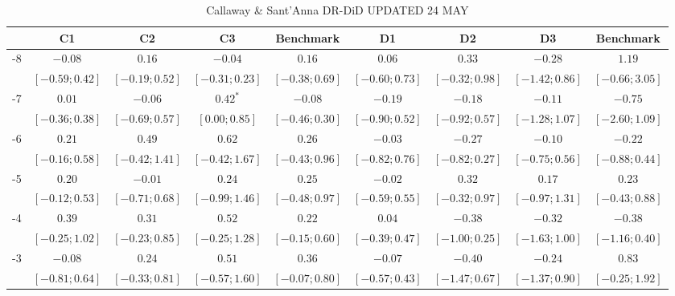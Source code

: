 \documentclass[12pt]{amsart}
\begin{document}
\begin{table}
  \centering
  \caption{Callaway \& Sant'Anna DR-DiD UPDATED 24 MAY}
  \begin{adjustbox}{width=\textwidth}
\begin{tabular}{l c c c c | c c c c}
\hline
 & C1 & C2 & C3 & Benchmark & D1 & D2 & D3 & Benchmark \\
\hline
-8 & $-0.08$          & $0.16$           & $-0.04$          & $0.16$           & $0.06$           & $0.33$           & $-0.28$          & $1.19$           \\
   & $ [-0.59; 0.42]$ & $ [-0.19; 0.52]$ & $ [-0.31; 0.23]$ & $ [-0.38; 0.69]$ & $ [-0.60; 0.73]$ & $ [-0.32; 0.98]$ & $ [-1.42; 0.86]$ & $ [-0.66; 3.05]$ \\
-7 & $0.01$           & $-0.06$          & $0.42^{*}$       & $-0.08$          & $-0.19$          & $-0.18$          & $-0.11$          & $-0.75$          \\
   & $ [-0.36; 0.38]$ & $ [-0.69; 0.57]$ & $ [ 0.00; 0.85]$ & $ [-0.46; 0.30]$ & $ [-0.90; 0.52]$ & $ [-0.92; 0.57]$ & $ [-1.28; 1.07]$ & $ [-2.60; 1.09]$ \\
-6 & $0.21$           & $0.49$           & $0.62$           & $0.26$           & $-0.03$          & $-0.27$          & $-0.10$          & $-0.22$          \\
   & $ [-0.16; 0.58]$ & $ [-0.42; 1.41]$ & $ [-0.42; 1.67]$ & $ [-0.43; 0.96]$ & $ [-0.82; 0.76]$ & $ [-0.82; 0.27]$ & $ [-0.75; 0.56]$ & $ [-0.88; 0.44]$ \\
-5 & $0.20$           & $-0.01$          & $0.24$           & $0.25$           & $-0.02$          & $0.32$           & $0.17$           & $0.23$           \\
   & $ [-0.12; 0.53]$ & $ [-0.71; 0.68]$ & $ [-0.99; 1.46]$ & $ [-0.48; 0.97]$ & $ [-0.59; 0.55]$ & $ [-0.32; 0.97]$ & $ [-0.97; 1.31]$ & $ [-0.43; 0.88]$ \\
-4 & $0.39$           & $0.31$           & $0.52$           & $0.22$           & $0.04$           & $-0.38$          & $-0.32$          & $-0.38$          \\
   & $ [-0.25; 1.02]$ & $ [-0.23; 0.85]$ & $ [-0.25; 1.28]$ & $ [-0.15; 0.60]$ & $ [-0.39; 0.47]$ & $ [-1.00; 0.25]$ & $ [-1.63; 1.00]$ & $ [-1.16; 0.40]$ \\
-3 & $-0.08$          & $0.24$           & $0.51$           & $0.36$           & $-0.07$          & $-0.40$          & $-0.24$          & $0.83$           \\
   & $ [-0.81; 0.64]$ & $ [-0.33; 0.81]$ & $ [-0.57; 1.60]$ & $ [-0.07; 0.80]$ & $ [-0.57; 0.43]$ & $ [-1.47; 0.67]$ & $ [-1.37; 0.90]$ & $ [-0.25; 1.92]$ \\

\end{tabular}
\end{adjustbox}
\end{table}
\end{document}
